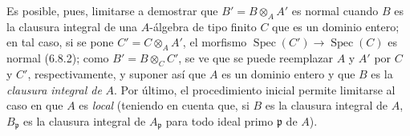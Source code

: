 Es posible, pues, limitarse a demostrar que
$B'=B\otimes_A A'$ es normal cuando $B$ es
la clausura integral de una
$A$-álgebra de tipo finito $C$ que es un dominio entero; en tal caso,
si se pone $C'=C\otimes_A A'$, el morfismo
$\operatorname{Spec}(C')\to\operatorname{Spec}(C)$ es normal (6.8.2);
como $B'=B\otimes_C C'$, se ve que se puede reemplazar $A$ y $A'$ por
$C$ y $C'$, respectivamente, y suponer así que $A$ es un dominio
entero y que $B$ es la \emph{clausura integral de} $A$. Por último, el
procedimiento inicial permite limitarse al caso en que $A$ es \emph{local}
(teniendo en cuenta que, si $B$ es la clausura integral de $A$,
$B_\mathfrak p$ es la clausura integral de $A_\mathfrak p$ para todo
ideal primo $\mathfrak p$ de $A$).
